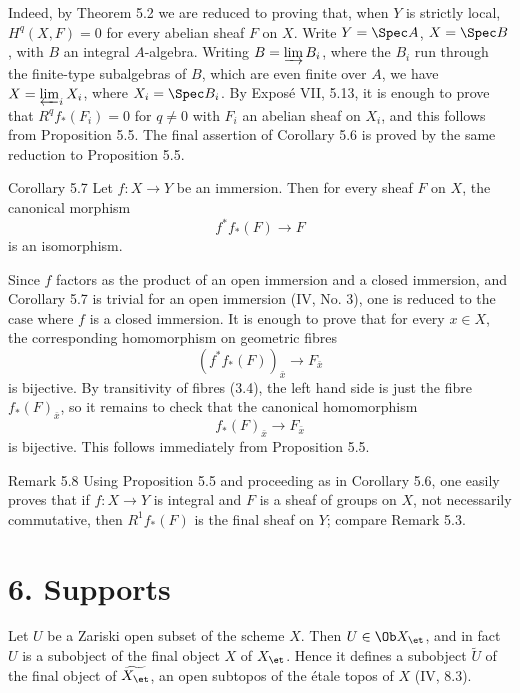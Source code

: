 Indeed, by Theorem 5.2 we are reduced to proving that, when \(Y\) is strictly local, \(H^q(X,F)=0\) for every abelian sheaf \(F\) on \(X\). Write \(Y=\Spec A\), \(X=\Spec B\), with \(B\) an integral \(A\)-algebra. Writing \(B=\varinjlim B_i\), where the \(B_i\) run through the finite-type subalgebras of \(B\), which are even finite over \(A\), we have \(X=\varprojlim_i X_i\), where \(X_i=\Spec B_i\). By Expos\'e VII, 5.13, it is enough to prove that \(R^qf_*(F_i)=0\) for \(q\ne 0\) with \(F_i\) an abelian sheaf on \(X_i\), and this follows from Proposition 5.5. The final assertion of Corollary 5.6 is proved by the same reduction to Proposition 5.5.

\begin{statement}{Corollary 5.7}
Let \(f:X\to Y\) be an immersion. Then for every sheaf \(F\) on \(X\), the canonical morphism
\[
f^*f_*(F)\longrightarrow F
\]
is an isomorphism.
\end{statement}

Since \(f\) factors as the product of an open immersion and a closed immersion, and Corollary 5.7 is trivial for an open immersion (IV, No. 3), one is reduced to the case where \(f\) is a closed immersion. It is enough to prove that for every \(x\in X\), the corresponding homomorphism on geometric fibres
\[
(f^*f_*(F))_{\bar x}\longrightarrow F_{\bar x}
\]
is bijective. By transitivity of fibres (3.4), the left hand side is just the fibre \(f_*(F)_{\bar x}\), so it remains to check that the canonical homomorphism
\[
f_*(F)_{\bar x}\longrightarrow F_{\bar x}
\]
is bijective. This follows immediately from Proposition 5.5.

\begin{remarktext}{Remark 5.8}
Using Proposition 5.5 and proceeding as in Corollary 5.6, one easily proves that if \(f:X\to Y\) is integral and \(F\) is a sheaf of groups on \(X\), not necessarily commutative, then \(R^1f_*(F)\) is the final sheaf on \(Y\); compare Remark 5.3.
\end{remarktext}

\section*{6. Supports}

Let \(U\) be a Zariski open subset of the scheme \(X\). Then \(U\in\Ob X_{\et}\), and in fact \(U\) is a subobject of the final object \(X\) of \(X_{\et}\). Hence it defines a subobject \(\widetilde U\) of the final object of \(\widetilde{X_{\et}}\), \ie an open subtopos of the \'etale topos of \(X\) (IV, 8.3).

